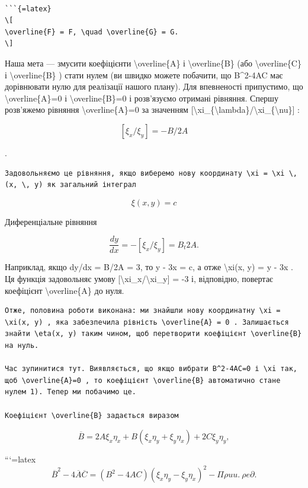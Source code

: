 \documentclass[
]{article}
\begin{document}
\begin{verbatim}

```{=latex}
\[
\overline{F} = F, \quad \overline{G} = G.
\]
\end{verbatim}

Наша мета --- змусити коефіцієнти \textbackslash overline\{A\} і
\textbackslash overline\{B\} (або \textbackslash overline\{C\} і
\textbackslash overline\{B\} ) стати нулем (ви швидко можете побачити,
що B\^{}2-4AC має дорівнювати нулю для реалізації нашого плану). Для
впевненості припустимо, що \textbackslash overline\{A\}=0 і
\textbackslash overline\{B\}=0 і розв'язуємо отримані рівняння. Спершу
розв'яжемо рівняння \textbackslash overline\{A\}=0 за значенням
{[}\textbackslash xi\_\{\textbackslash lambda\}/\textbackslash xi\_\{\textbackslash nu\}{]}
:

\[
[\xi_x/\xi_y] = -B/2A
\]

.

\begin{verbatim}
Задовольняємо це рівняння, якщо виберемо нову координату \xi = \xi \, (x, \, y) як загальний інтеграл
\end{verbatim}

\[
\xi(x, y) = c
\]

Диференціальне рівняння

\[
\frac{dy}{dx} = -\left[\xi_x/\xi_y\right] = B_t 2A.
\]

Наприклад, якщо dy/dx = B/2A = 3, то y - 3x = c, а отже
\textbackslash xi(x, y) = y - 3x . Ця функція задовольняє умову
{[}\textbackslash xi\_x/\textbackslash xi\_y{]} = -3 і, відповідно,
повертає коефіцієнт \textbackslash overline\{A\} до нуля.

\begin{verbatim}
Отже, половина роботи виконана: ми знайшли нову координатну \xi = \xi(x, y) , яка забезпечила рівність \overline{A} = 0 . Залишається знайти \eta(x, y) таким чином, щоб перетворити коефіцієнт \overline{B} на нуль.

Час зупинитися тут. Виявляється, що якщо вибрати B^2-4AC=0 і \xi так, щоб \overline{A}=0 , то коефіцієнт \overline{B} автоматично стане нулем 1). Тепер ми побачимо це.

Коефіцієнт \overline{B} задається виразом
\end{verbatim}

\[
\overline{B} = 2A\xi_x\eta_x + B(\xi_x\eta_y + \xi_y\eta_x) + 2C\xi_y\eta_y,
\]

```{=latex}
\[
\overline{B}^2 - 4\overline{A}\overline{C} = (B^2 - 4AC) (\xi_x \eta_y - \xi_y \eta_x)^2 - \Pi \rho u u. \ \rho e \partial.
\]
\end{document}
